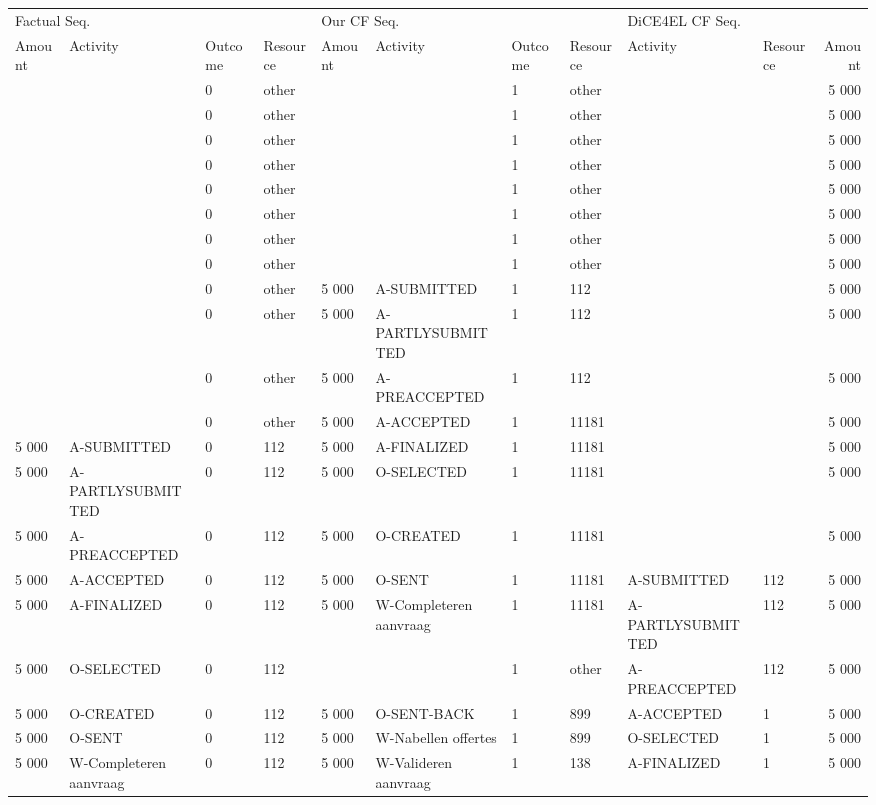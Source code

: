 \begin{tabular}{llllllllllr}
\toprule
\multicolumn{4}{l}{Factual Seq.} & \multicolumn{4}{l}{Our CF Seq.} & \multicolumn{3}{l}{DiCE4EL CF Seq.} \\
Amount & Activity & Outcome & Resource & Amount & Activity & Outcome & Resource & Activity & Resource & Amount \\
\midrule
 &  & 0 & other &  &  & 1 & other &  &  & 5 000 \\
 &  & 0 & other &  &  & 1 & other &  &  & 5 000 \\
 &  & 0 & other &  &  & 1 & other &  &  & 5 000 \\
 &  & 0 & other &  &  & 1 & other &  &  & 5 000 \\
 &  & 0 & other &  &  & 1 & other &  &  & 5 000 \\
 &  & 0 & other &  &  & 1 & other &  &  & 5 000 \\
 &  & 0 & other &  &  & 1 & other &  &  & 5 000 \\
 &  & 0 & other &  &  & 1 & other &  &  & 5 000 \\
 &  & 0 & other & 5 000 & A-SUBMITTED & 1 & 112 &  &  & 5 000 \\
 &  & 0 & other & 5 000 & A-PARTLYSUBMITTED & 1 & 112 &  &  & 5 000 \\
 &  & 0 & other & 5 000 & A-PREACCEPTED & 1 & 112 &  &  & 5 000 \\
 &  & 0 & other & 5 000 & A-ACCEPTED & 1 & 11181 &  &  & 5 000 \\
5 000 & A-SUBMITTED & 0 & 112 & 5 000 & A-FINALIZED & 1 & 11181 &  &  & 5 000 \\
5 000 & A-PARTLYSUBMITTED & 0 & 112 & 5 000 & O-SELECTED & 1 & 11181 &  &  & 5 000 \\
5 000 & A-PREACCEPTED & 0 & 112 & 5 000 & O-CREATED & 1 & 11181 &  &  & 5 000 \\
5 000 & A-ACCEPTED & 0 & 112 & 5 000 & O-SENT & 1 & 11181 & A-SUBMITTED & 112 & 5 000 \\
5 000 & A-FINALIZED & 0 & 112 & 5 000 & W-Completeren aanvraag & 1 & 11181 & A-PARTLYSUBMITTED & 112 & 5 000 \\
5 000 & O-SELECTED & 0 & 112 &  &  & 1 & other & A-PREACCEPTED & 112 & 5 000 \\
5 000 & O-CREATED & 0 & 112 & 5 000 & O-SENT-BACK & 1 & 899 & A-ACCEPTED & 1 & 5 000 \\
5 000 & O-SENT & 0 & 112 & 5 000 & W-Nabellen offertes & 1 & 899 & O-SELECTED & 1 & 5 000 \\
5 000 & W-Completeren aanvraag & 0 & 112 & 5 000 & W-Valideren aanvraag & 1 & 138 & A-FINALIZED & 1 & 5 000 \\

\end{tabular}
